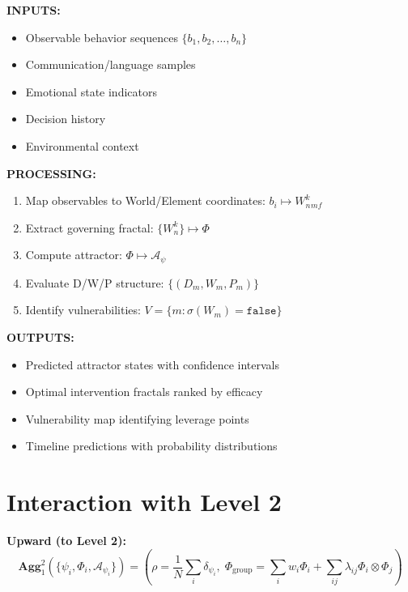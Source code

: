 \documentclass[11pt,twoside]{book}
\newcommand{\Frac}{\Phi}
\newcommand{\PsychAttractor}{\mathcal{A}_\psi}
\newcommand{\GroupFrac}{\Phi_{\mathrm{group}}}
\newcommand{\Aggregate}[2]{\mathbf{Agg}_{#1}^{#2}}
\begin{document}
\begin{tcolorbox}[colback=blue!5!white,colframe=blue!65!black,title=\textbf{Level 1 I/O Specification}]
\textbf{INPUTS:}
\begin{itemize}
    \item Observable behavior sequences $\{b_1, b_2, \ldots, b_n\}$
    \item Communication/language samples
    \item Emotional state indicators
    \item Decision history
    \item Environmental context
\end{itemize}

\textbf{PROCESSING:}
\begin{enumerate}
    \item Map observables to World/Element coordinates: $b_i \mapsto W_n^k_{mf}$
    \item Extract governing fractal: $\{W_n^k\} \mapsto \Frac$
    \item Compute attractor: $\Frac \mapsto \PsychAttractor$
    \item Evaluate D/W/P structure: $\{(D_m, W_m, P_m)\}$
    \item Identify vulnerabilities: $V = \{m : \sigma(W_m) = \mathtt{false}\}$
\end{enumerate}

\textbf{OUTPUTS:}
\begin{itemize}
    \item Predicted attractor states with confidence intervals
    \item Optimal intervention fractals ranked by efficacy
    \item Vulnerability map identifying leverage points
    \item Timeline predictions with probability distributions
\end{itemize}
\end{tcolorbox}

\section{Interaction with Level 2}

\textbf{Upward (to Level 2):}
\begin{equation}
    \Aggregate{1}{2}(\{\psi_i, \Frac_i, \PsychAttractor_i\}) =
    \left(\rho = \frac{1}{N}\sum_i \delta_{\psi_i}, \;
    \GroupFrac = \sum_i w_i \Frac_i + \sum_{ij} \lambda_{ij} \Frac_i \otimes \Frac_j\right)
\end{equation}
\end{document}
